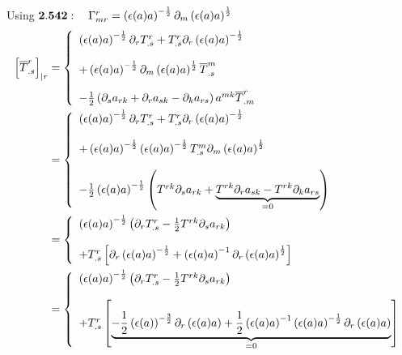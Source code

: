 Using $\mathbf{2.542}:\quad \Gamma^r_{mr}= \left(\epsilon (a) a\right)^{-\frac{1}{2}}\partial_m \left(\epsilon (a) a\right)^{\frac{1}{2}}$
\begin{align}
\left[\overline{T}^r_{.s} \right]_{|r}&=\left\{\begin{array}{l}
\left(\epsilon (a) a\right)^{-\frac{1}{2}}\partial_r T^r_{.s} + T^r_{.s}\partial_r \left(\epsilon (a) a\right)^{-\frac{1}{2}}\\\\
  + \left(\epsilon (a) a\right)^{-\frac{1}{2}}\partial_m \left(\epsilon (a) a\right)^{\frac{1}{2}}\overline{T}^m_{.s} \\\\
   - \frac{1}{2}\left(\partial_s a_{rk} + \partial_r a_{sk}-\partial_k a_{rs} \right)a^{mk}\overline{T}^r_{.m}\\
\end{array}\right.\\
&=\left\{\begin{array}{l}
\left(\epsilon (a) a\right)^{-\frac{1}{2}}\partial_r T^r_{.s} + T^r_{.s}\partial_r \left(\epsilon (a) a\right)^{-\frac{1}{2}}\\\\
  + \left(\epsilon (a) a\right)^{-\frac{1}{2}}\left(\epsilon (a) a \right)^{-\frac{1}{2}}T^m_{.s}\partial_m \left(\epsilon (a) a\right)^{\frac{1}{2}} \\\\
    - \frac{1}{2}\left(\epsilon (a) a\right)^{-\frac{1}{2}}\left(T^{rk}\partial_s a_{rk} + \underbrace{T^{rk}\partial_r a_{sk}-T^{rk}\partial_k a_{rs}}_{=0} \right)
\end{array}\right.\\
&=\left\{\begin{array}{l}
\left(\epsilon (a) a\right)^{-\frac{1}{2}}\left(\partial_r T^r_{.s} - \frac{1}{2} T^{rk}\partial_s a_{rk}\right)\\\\
+ T^r_{.s}\left[\partial_r \left(\epsilon (a) a\right)^{-\frac{1}{2}}+ 
\left(\epsilon (a) a\right)^{-1}\partial_r \left(\epsilon (a) a\right)^{\frac{1}{2}} \right]
\end{array}\right.\\
&=\left\{\begin{array}{l}
\left(\epsilon (a) a\right)^{-\frac{1}{2}}\left(\partial_r T^r_{.s} - \frac{1}{2} T^{rk}\partial_s a_{rk}\right)\\\\
+ T^r_{.s}\left[\underbrace{-\frac{1}{2} \left(\epsilon (a)\right)^{-\frac{3}{2}}\partial_r \left(\epsilon (a) a\right)+ 
\frac{1}{2}\left(\epsilon (a) a\right)^{-1}\left(\epsilon (a) a\right)^{-\frac{1}{2}}\partial_r \left(\epsilon (a) a\right)}_{=0} \right]
\end{array}\right.
\end{align}
